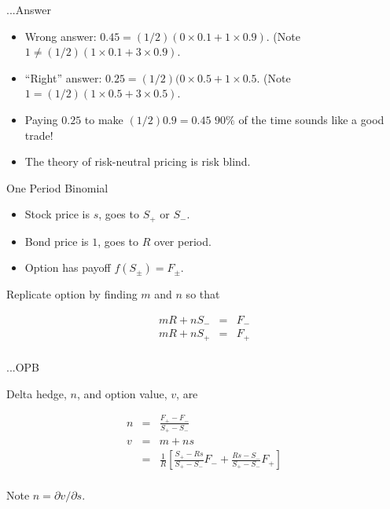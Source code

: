 \documentclass[pdf,colorBG,slideColor,blends]{prosper}
\begin{document}
\begin{slide}{{...}Answer}

\begin{itemize}

\item Wrong answer: $0.45 = (1/2)(0\times 0.1 + 1\times 0.9)$. (Note $1 \not=
(1/2)(1\times 0.1 + 3\times 0.9)$.

\item ``Right'' answer: $0.25 = (1/2)(0\times 0.5 + 1\times 0.5$. (Note $1 =
(1/2)(1\times 0.5 + 3\times 0.5)$.

\item Paying $0.25$ to make $(1/2)0.9 = 0.45$ $90\%$ of the time sounds like
a good trade!

\item The theory of risk-neutral pricing is risk blind.

\end{itemize}

\end{slide}

\begin{slide}{One Period Binomial}

\begin{itemize}

\item Stock price is $s$, goes to $S_+$ or $S_-$.

\item Bond price is $1$, goes to $R$ over period.

\item Option has payoff $f(S_\pm) = F_\pm$.

\end{itemize}

Replicate option by finding $m$ and $n$ so that

\begin{eqnarray*}
	mR + nS_- &=& F_-\\
	mR + nS_+ &=& F_+\\
\end{eqnarray*}

\end{slide}

\begin{slide}{{...}OPB}

Delta hedge, $n$, and option value, $v$, are

\begin{eqnarray*}
	n &=& \frac{F_+ - F_-}{S_+ - S_-} \\
	v &=& m + ns \\
	  &=& \frac{1}{R}\left[\frac{S_+ - Rs}{S_+ - S_-} F_-
		+ \frac{Rs - S_-}{S_+ - S_-} F_+\right] \\
\end{eqnarray*}

Note $n = \partial v/\partial s$.

\end{slide}
\end{document}
